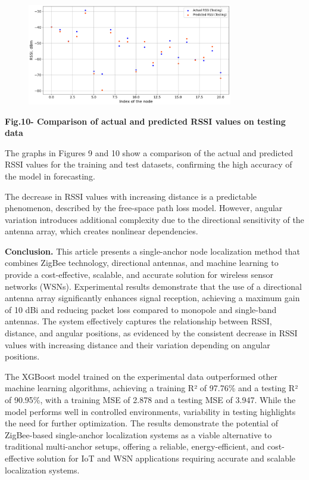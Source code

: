 \begin{figure}[H]
	\centering
	\includegraphics[width=0.8\textwidth]{media/ict/image50}
	\caption*{}
\end{figure}


{\bfseries Fig.10- Comparison of actual and predicted RSSI values
\hspace{0pt}\hspace{0pt}on testing data}

The graphs in Figures 9 and 10 show a comparison of the actual and
predicted RSSI values \hspace{0pt}\hspace{0pt}for the training and test
datasets, confirming the high accuracy of the model in forecasting.

The decrease in RSSI values with increasing distance is a predictable
phenomenon, described by the free-space path loss model. However,
angular variation introduces additional complexity due to the
directional sensitivity of the antenna array, which creates nonlinear
dependencies.

{\bfseries Conclusion.} This article presents a single-anchor node
localization method that combines ZigBee technology, directional
antennas, and machine learning to provide a cost-effective, scalable,
and accurate solution for wireless sensor networks (WSNs). Experimental
results demonstrate that the use of a directional antenna array
significantly enhances signal reception, achieving a maximum gain of 10
dBi and reducing packet loss compared to monopole and single-band
antennas. The system effectively captures the relationship between RSSI,
distance, and angular positions, as evidenced by the consistent decrease
in RSSI values with increasing distance and their variation depending on
angular positions.

The XGBoost model trained on the experimental data outperformed other
machine learning algorithms, achieving a training R² of 97.76\% and a
testing R² of 90.95\%, with a training MSE of 2.878 and a testing MSE of
3.947. While the model performs well in controlled environments,
variability in testing highlights the need for further optimization. The
results demonstrate the potential of ZigBee-based single-anchor
localization systems as a viable alternative to traditional multi-anchor
setups, offering a reliable, energy-efficient, and cost-effective
solution for IoT and WSN applications requiring accurate and scalable
localization systems.

